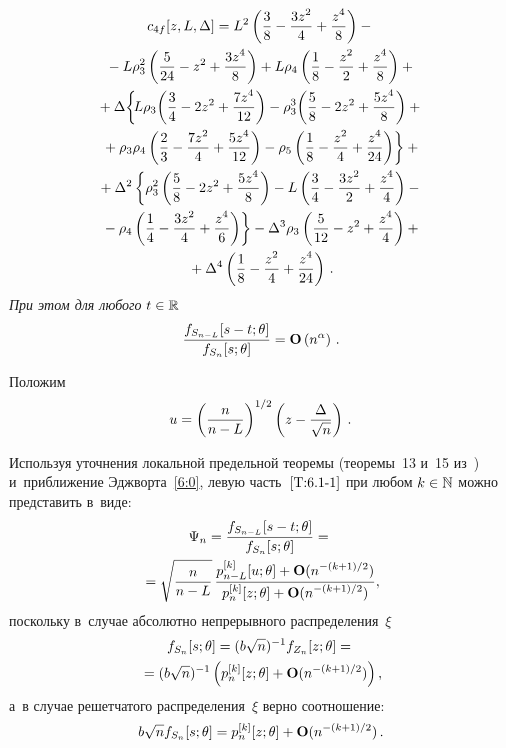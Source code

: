 \begin{multicols}{2}
 \begin{multline*}
  c_{4f}[z,L,\Delta]
  =L^2\left(\fr{3}{8}-\fr{3 z^2}{4}+\fr{z^4}{8}\right)
  -{}\\
  {}- L\rho_3^2\left(\fr{5}{24}-z^2+\fr{3 z^4}{8}\right)+L\rho_4\left(\fr{1}{8}-\fr{z^2}{2}+\fr{z^4}{8}\right)
   +{}\\
   {}+\Delta \!\left\{\!L\rho_3\!\left(\fr{3}{4}-2 z^2+\fr{7z^4}{12}\right)
   -\rho_3^3\!\left(\fr{5}{8}-2 z^2+\fr{5 z^4}{8}\right)
   +{}\right.
\\
   \left.
  {} +\rho_3\rho_4\left(\fr{2}{3}-\fr{7z^2}{4}+\fr{5z^4}{12}\right)
   -\rho_5\left(\fr{1}{8}-\fr{z^2}{4}+\fr{z^4}{24}\right)\right\}+{}
\\
  {}   +\Delta^2 \left\{
    \rho_3^2\left(\fr{5}{8}-2z^2+\fr{5z^4}{8}\right)
   -L\left(\fr{3}{4}-\fr{3z^2}{2}+\fr{z^4}{4}\right)
   -{}\right.\\
\left.   {}-\rho_4\left(\fr{1}{4}-\fr{3z^2}{4}+\fr{z^4}{6}\right)\right\}-\Delta^3 \rho_3\left(\fr{5}{12}-z^2+\fr{z^4}{4}\right)+{}\\
{}+
    \Delta^4\left(\fr{1}{8}-\fr{z^2}{4}+\fr{z^4}{24}\right)\,.
  \end{multline*}
\textit{При этом для любого} $t\hm\in\mathbb{R}$
  \begin{equation}
\fr{f_{S_{n-L}}[s-t;\theta]}{f_{S_n}[s;\theta]}
  =\Op\left(n^{\alpha} \right)\,.
 \label{T:6.1-2}
 \end{equation}

 \Do
 Положим 
 $$
 u=\left(\fr{n}{n-L}\right)^{1/2}\left(z-\fr{\Delta}{\sqrt{n}}\right)\,.
 $$
 
 Используя уточнения локальной предельной тео\-ре\-мы 
 (тео\-ремы~13 и~15 из~\cite{10-ch}) и~приближение Эджворта~\eqref{6:0},
 левую часть~$\eqref{T:6.1-1}$ при любом $k\hm\in\mathbb{N}$ можно представить в~виде:
 \begin{multline}
\Psi_n=\fr{f_{S_{n-L}}[s-t;\theta]}{f_{S_n}[s;\theta]}={}\\
{}=
 \sqrt{\fr{n}{n-L}} \,
  \fr{p_{n-L}^{[k]}[u;\theta]  +\Op(n^{-(k+1)/2})}
  {p_{n}^{[k]}[z;\theta]+\Op(n^{-(k+1)/2})},
 \label{T:6.1-3}
 \end{multline}
 поскольку в~случае абсолютно непрерывного распределения~$\xi$
 \begin{multline*}
 f_{S_n}[s;\theta]=(b\sqrt{n})^{-1} f_{Z_n}[z;\theta]={}\\
 {}=
 (b\sqrt{n})^{-1}\left(p_{n}^{[k]}[z;\theta]+\Op(n^{-(k+1)/2})\right),
 \end{multline*}
 а~в случае решетчатого распределения~$\xi$ верно соотношение:
 \begin{equation*}
 b\sqrt{n}f_{S_n}[s;\theta]=p_{n}^{[k]}[z;\theta]+\Op(n^{-(k+1)/2})\,.
 \end{equation*}


\end{multicols}
